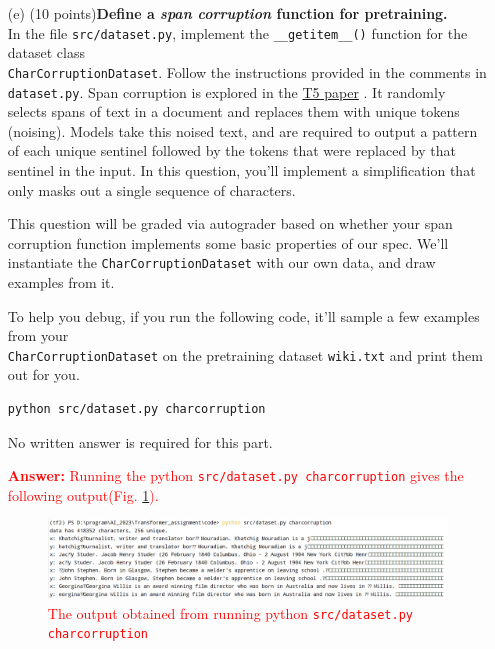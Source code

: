 \documentclass[letterpaper,12pt]{article}
\begin{document}
\begin{itemize}
	\item[(e)]
		(10 points)\textbf{Define a \textit{span corruption} function for pretraining.}\\
		In the file \texttt{src/dataset.py}, implement the \texttt{\_\_getitem\_\_()} function for the dataset class \\ \texttt{CharCorruptionDataset}.
		Follow the instructions provided in the comments in \texttt{dataset.py}.
		Span corruption is explored in the \href{https://arxiv.org/pdf/1910.10683.pdf}{T5 paper} \cite{b2}.
		It randomly selects spans of text in a document and replaces them with unique tokens (noising).
		Models take this noised text, and are required to output a pattern of each unique sentinel followed by the tokens that were replaced by that sentinel in the input.
		In this question, you'll implement a simplification that only masks out a single sequence of characters.
		
		This question will be graded via autograder based on whether your span corruption function implements some basic properties of our spec.
		We'll instantiate the \texttt{CharCorruptionDataset} with our own data, and draw examples from it.
		
		To help you debug, if you run the following code, it'll sample a few examples from your \\ \texttt{CharCorruptionDataset} on the pretraining dataset \texttt{wiki.txt} and print them out for you.
		\begin{lstlisting}[language=bash]
			python src/dataset.py charcorruption
		\end{lstlisting}
		
		No written answer is required for this part.
		
		\textcolor{red}{\textbf{Answer:} Running the python \texttt{src/dataset.py charcorruption} gives the following output(Fig. \ref{fig: 2.e.result}).
			\begin{figure}[htbp] 
				\centering 
				\includegraphics[width=0.9\linewidth]{picture/2.e.result}
				\captionsetup{font=small}
				\caption{
					\label{fig: 2.e.result} %
					The output obtained from running python \texttt{src/dataset.py charcorruption}
				}
			\end{figure}
		}
		

\end{itemize}
\end{document}
